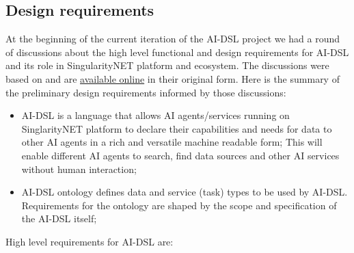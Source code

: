 \documentclass[]{report}
\begin{document}
\subsection{Design requirements}
\label{sec:design-requirements}

At the beginning of the current iteration of the AI-DSL project we had a round
of discussions about the high level functional and design requirements for
AI-DSL and its role in SingularityNET platform and ecosystem. The discussions
were based on
\cite{GoertzelGeisweillerBlog,singularitynet_foundation_phasetwo_2021}  and are
\href{https://github.com/nunet-io/ai-dsl-ontology/wiki/AI-DSL\%20requirements}{available
online} in their original form. Here is the summary of the preliminary design
requirements informed by those discussions:

\begin{itemize} \item AI-DSL is a language that allows AI agents/services
running on SinglarityNET platform to declare their capabilities and needs for
data to other AI agents in a rich and versatile machine readable form; This will
enable different AI agents to search, find data sources and other AI services
without human interaction; \item AI-DSL ontology defines data and service
(task) types to be used by AI-DSL. Requirements for the ontology are shaped by
the scope and specification of the AI-DSL itself; \end{itemize}

High level requirements for AI-DSL are:
\end{document}
